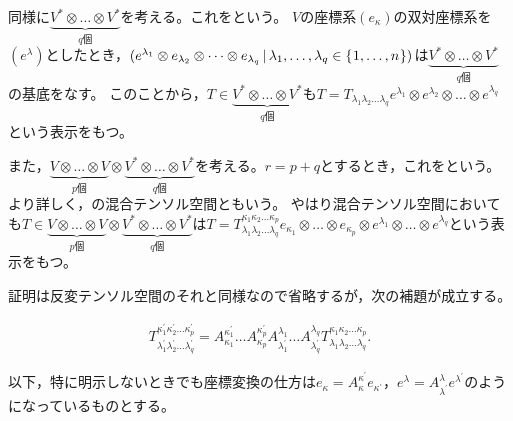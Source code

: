 \documentclass[uplatex]{jsarticle}
\begin{document}
同様に$\underbrace{V^{*} \otimes \dots \otimes V^{*}}_{q\text{個}}$を考える。これをという。
$V$の座標系$(e_{\kappa})$の双対座標系を$(e^{\lambda})$としたとき，$(e^{\lambda_{1}} \otimes e_{\lambda_{2}} \otimes \dots \otimes e_{\lambda_{q}} \,|\, \lambda_{1}, \dots, \lambda_{q} \in \Set{\hspace{-1.8pt} 1,\dots, n \hspace{-1.8pt}})$は$\underbrace{V^{*} \otimes \dots \otimes V^{*}}_{q\text{個}}$の基底をなす。
このことから，$T \in \underbrace{V^{*} \otimes \dots \otimes V^{*}}_{q\text{個}}$も$T = T_{\lambda_{1}\lambda_{2} \dots \lambda_{q}}e^{\lambda_{1}} \otimes e^{\lambda_{2}} \otimes \dots \otimes e^{\lambda_{q}}$という表示をもつ。

また，$\underbrace{V \otimes \dots \otimes V}_{p\text{個}} \otimes \underbrace{V^{*} \otimes \dots \otimes V^{*}}_{q\text{個}}$を考える。$r = p+q$とするとき，これをという。より詳しく，の混合テンソル空間ともいう。
やはり混合テンソル空間においても$T \in \underbrace{V \otimes \dots \otimes V}_{p\text{個}} \otimes \underbrace{V^{*} \otimes \dots \otimes V^{*}}_{q\text{個}}$は$T = T^{\kappa_{1}\kappa_{2}\dots\kappa_{p}}_{\lambda_{1}\lambda_{2} \dots \lambda_{q}} e_{\kappa_{1}} \otimes \dots \otimes e_{\kappa_{p}} \otimes e^{\lambda_{1}} \otimes \dots \otimes e^{\lambda_{q}}$という表示をもつ。

証明は反変テンソル空間のそれと同様なので省略するが，次の補題が成立する。
\begin{hodai}[変換則]
  \begin{align}
    T^{\kappa^{\prime}_{1}\kappa^{\prime}_{2}\dots\kappa^{\prime}_{p}}_{\lambda^{\prime}_{1}\lambda^{\prime}_{2} \dots \lambda^{\prime}_{q}} = A_{\kappa_{1}}^{\kappa^{\prime}_{1}} \dots A_{\kappa_{p}}^{\kappa^{\prime}_{p}} A^{\lambda_{1}}_{\lambda^{\prime}_{1}} \dots A^{\lambda_{q}}_{\lambda^{\prime}_{q}} T^{\kappa_{1}\kappa_{2}\dots\kappa_{p}}_{\lambda_{1}\lambda_{2} \dots \lambda_{q}}.
  \end{align}
\end{hodai}

以下，特に明示しないときでも座標変換の仕方は$e_{\kappa} = A^{\kappa^{\prime}}_{\kappa} e_{\kappa^{\prime}}$，$e^{\lambda} = A^{\lambda}_{\lambda^{\prime}}e^{\lambda^{\prime}}$のようになっているものとする。
\end{document}

